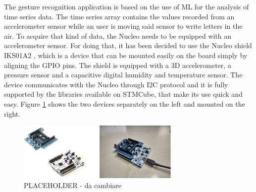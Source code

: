 \documentclass[12pt]{report}
\begin{document}
The gesture recognition application is based on the use of ML for the analysis of time series data. The time series array contains the values recorded from an accelerometer sensor while an user is moving said sensor to write letters in the air. To acquire that kind of data, the Nucleo needs to be equipped with an accelerometer sensor. For doing that, it has been decided to use the Nucleo shield IKS01A2 \autocite{shield_web_page}, which is a device that can be mounted easily on the board simply by aligning the GPIO pins. The shield is equipped with a 3D accelerometer, a pressure sensor and a capacitive digital humidity and temperature sensor. The device communicates with the Nucleo through I2C protocol and it is fully supported by the libraries available on STMCube, that make its use quick and easy. Figure \ref{fig:hardware_stm} shows the two devices separately on the left and mounted on the right.\\

\begin{figure}[h!]
    \centering
    \includegraphics[width=0.7\textwidth]{Figures/Chapter2/hardware_stm.jpg} 
    \caption{PLACEHOLDER - da cambiare}
    \label{fig:hardware_stm}    
\end{figure}
\end{document}
